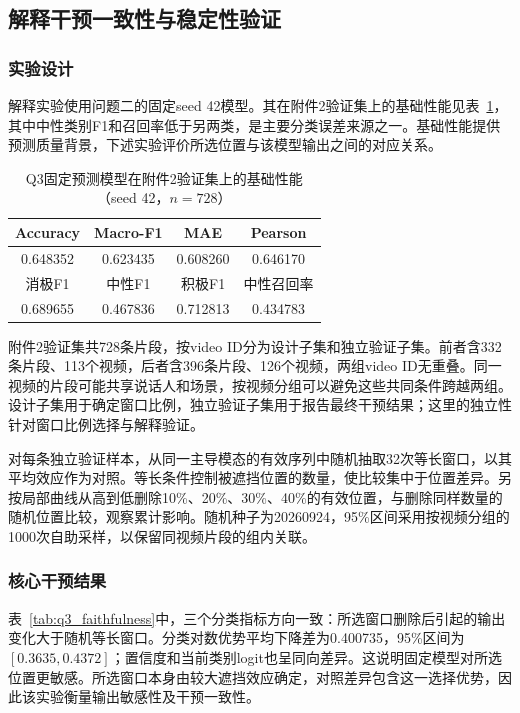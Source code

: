 \documentclass[UTF8,a4paper,12pt]{ctexart}
\newcommand{\QThreeParagraph}{\par\noindent\hspace*{2em}}
\begin{document}
\subsection{解释干预一致性与稳定性验证}\label{subsec:q3_faithfulness}
\subsubsection{实验设计}
\QThreeParagraph 解释实验使用问题二的固定seed 42模型。其在附件2验证集上的基础性能见表~\ref{tab:q3_predictor}，其中中性类别F1和召回率低于另两类，是主要分类误差来源之一。基础性能提供预测质量背景，下述实验评价所选位置与该模型输出之间的对应关系。

\begin{table}[H]
\centering\small
\setlength{\tabcolsep}{6pt}
\caption{Q3固定预测模型在附件2验证集上的基础性能（seed 42，$n=728$）}
\label{tab:q3_predictor}
\begin{tabular}{@{}cccc@{}}
\toprule
Accuracy & Macro-F1 & MAE & Pearson\\
\midrule
0.648352 & 0.623435 & 0.608260 & 0.646170\\
\midrule
\QThreeParagraph 消极F1 & 中性F1 & 积极F1 & 中性召回率\\
\midrule
0.689655 & 0.467836 & 0.712813 & 0.434783\\
\bottomrule
\end{tabular}
\end{table}

\QThreeParagraph 附件2验证集共728条片段，按video ID分为设计子集和独立验证子集。前者含332条片段、113个视频，后者含396条片段、126个视频，两组video ID无重叠。同一视频的片段可能共享说话人和场景，按视频分组可以避免这些共同条件跨越两组。设计子集用于确定窗口比例，独立验证子集用于报告最终干预结果；这里的独立性针对窗口比例选择与解释验证。

\QThreeParagraph 对每条独立验证样本，从同一主导模态的有效序列中随机抽取32次等长窗口，以其平均效应作为对照。等长条件控制被遮挡位置的数量，使比较集中于位置差异。另按局部曲线从高到低删除10\%、20\%、30\%、40\%的有效位置，与删除同样数量的随机位置比较，观察累计影响。随机种子为20260924，95\%区间采用按视频分组的1000次自助采样，以保留同视频片段的组内关联。

\subsubsection{核心干预结果}
\QThreeParagraph 表~\ref{tab:q3_faithfulness}中，三个分类指标方向一致：所选窗口删除后引起的输出变化大于随机等长窗口。分类对数优势平均下降差为0.400735，95\%区间为$[0.3635,0.4372]$；置信度和当前类别logit也呈同向差异。这说明固定模型对所选位置更敏感。所选窗口本身由较大遮挡效应确定，对照差异包含这一选择优势，因此该实验衡量输出敏感性及干预一致性。
\end{document}
